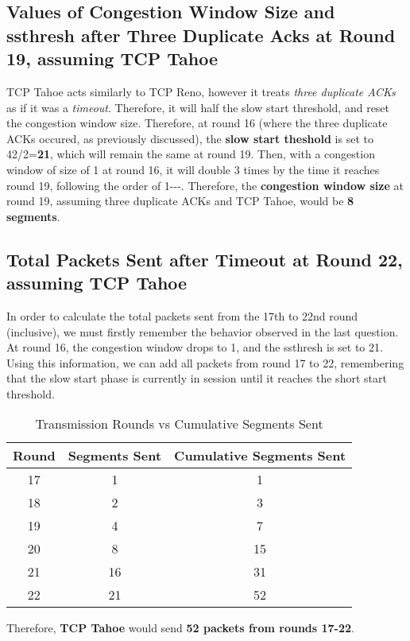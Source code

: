 \documentclass[colorlinks=true, allcolors=blue]{article}
\begin{document}
\subsection{Values of Congestion Window Size and ssthresh after Three Duplicate Acks at Round 19, assuming TCP Tahoe}
TCP Tahoe acts similarly to TCP Reno, however it treats \textit{three duplicate ACKs} as if it was a \textit{timeout}. Therefore, it will half the slow start threshold, and reset the congestion window size. Therefore, at round 16 (where the three duplicate ACKs occured, as previously discussed), the \textbf{slow start theshold} is set to 42/2=\textbf{21}, which will remain the same at round 19. Then, with a congestion window of size of 1 at round 16, it will double 3 times by the time it reaches round 19, following the order of 1---. Therefore, the \textbf{congestion window size} at round 19, assuming three duplicate ACKs and TCP Tahoe, would be \textbf{8 segments}.

\subsection{Total Packets Sent after Timeout at Round 22, assuming TCP Tahoe}
In order to calculate the total packets sent from the 17th to 22nd round (inclusive), we must firstly remember the behavior observed in the last question. At round 16, the congestion window drops to 1, and the ssthresh is set to 21. Using this information, we can add all packets from round 17 to 22, remembering that the slow start phase is currently in session until it reaches the short start threshold.
\begin{table}[H]
\centering
\begin{tabular}{|c|c|c|}
\hline
\textbf{Round} & \textbf{Segments Sent} & \textbf{Cumulative Segments Sent} \\
\hline
17 & 1 & 1 \\
18 & 2 & 3 \\
19 & 4 & 7 \\
20 & 8 & 15 \\
21 & 16 & 31 \\
22 & 21 & 52 \\
\hline
\end{tabular}
\caption{Transmission Rounds vs Cumulative Segments Sent}
\end{table}
Therefore, \textbf{TCP Tahoe} would send \textbf{52 packets from rounds 17-22}. 

\clearpage  %
\end{document}
